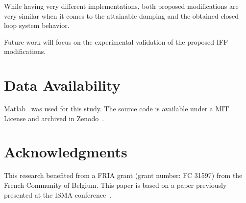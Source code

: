 \documentclass[10pt]{iopart}
\begin{document}
While having very different implementations, both proposed modifications are very similar when it comes to the attainable damping and the obtained closed loop system behavior.

Future work will focus on the experimental validation of the proposed IFF modifications.

\section*{Data Availability}
\label{sec:org6c5e786}
Matlab~\cite{matlab20} was used for this study.
The source code is available under a MIT License and archived in Zenodo~\cite{dehaeze20_activ_dampin_rotat_posit_platf}.

\section*{Acknowledgments}
\label{sec:org2c37487}
This research benefited from a FRIA grant (grant number: FC 31597) from the French Community of Belgium.
This paper is based on a paper previously presented at the ISMA conference~\cite{dehaeze20_activ_dampin_rotat_platf_integ_force_feedb}.



\end{document}
